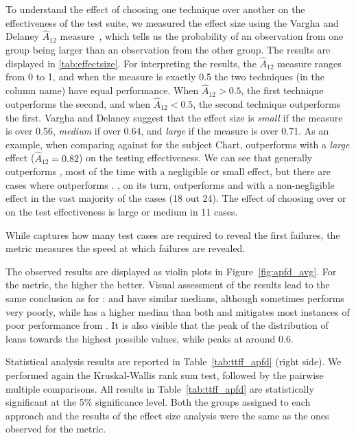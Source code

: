 To understand the effect of choosing one technique over another on the effectiveness of the test suite, we measured the effect size using the Vargha and Delaney $\hat{A}_{12}$ measure~\citep{vargha2000critique}, which tells us the probability of an observation from one group being larger than an observation from the other group.
The results are displayed in \autoref{tab:effectsize}. For interpreting the results, the $\hat{A}_{12}$ measure ranges from 0 to 1, and when the measure is exactly 0.5 the two techniques (in the column name) have equal performance. When $\hat{A}_{12}>0.5$, the first technique outperforms the second, and when $\hat{A}_{12}<0.5$, the second technique outperforms the first.
Vargha and Delaney suggest that the effect size is \textit{small} if the measure is over 0.56, \textit{medium} if over 0.64, and \textit{large} if the measure is over 0.71. As an example, when comparing \fz against \rnd for the subject Chart, \fz outperforms \rnd with a \textit{large} effect ($\hat{A}_{12}=0.82$) on the testing effectiveness.  
%
We can see that \ek generally outperforms \fs, most of the time with a negligible or small effect, but there are cases where \fs outperforms \ek.
\fz, on its turn, outperforms \ek and \fs with a non-negligible effect in the vast majority of the cases (18 out 24). The effect of choosing \fz over \ek or \fs on the test effectiveness is large or medium in 11 cases.


While \ttff captures how many test cases are required to reveal the first failures, 
the \apfd metric measures the speed at which failures are revealed.

The observed \apfd results are displayed as violin plots in Figure~\ref{fig:apfd_avg}.
For the \apfd metric, the higher
the better.
Visual assessment of the results lead to the same conclusion as for \pttff:
\ek and \fs have similar medians, although \fs sometimes performs very poorly, while \fz has a higher median than both and mitigates most instances of poor performance from \fs.
It is also visible that the peak of the distribution of \fz leans towards the highest possible values, while \ek peaks at around 0.6.

Statistical analysis results are reported in Table~\ref{tab:ttff_apfd} (right side). 
We performed again the Kruskal-Wallis rank sum test, followed by the pairwise multiple
comparisons.
All  results in Table~\ref{tab:ttff_apfd} are statistically
significant at the 5\% significance level.
Both the groups assigned to each approach 
and the results of the effect size analysis were the same as the ones observed for the \ttff metric.


